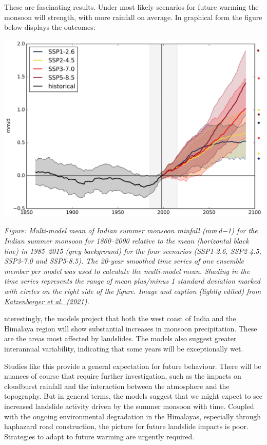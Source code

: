 \documentclass[
]{book}
\begin{document}
These are fascinating results. Under most likely scenarios for future warming the monsoon will strength, with more rainfall on average. In graphical form the figure below displays the outcomes:

\includegraphics{fig/petley_monsoon.png}

\emph{Figure: Multi-model mean of Indian summer monsoon rainfall (mm d−1) for the Indian summer monsoon for 1860--2090 relative to the mean (horizontal black line) in 1985--2015 (grey background) for the four scenarios (SSP1-2.6, SSP2-4.5, SSP3-7.0 and SSP5-8.5). The 20-year smoothed time series of one ensemble member per model was used to calculate the multi-model mean. Shading in the time series represents the range of mean plus/minus 1 standard deviation marked with circles on the right side of the figure. Image and caption (lightly edited) from \href{https://esd.copernicus.org/articles/12/367/2021/}{Katzenberger et al.~(2021)}.}

nterestingly, the models project that both the west coast of India and the Himalaya region will show substantial increases in monsoon precipitation. These are the areas most affected by landslides. The models also suggest greater interannual variability, indicating that some years will be exceptionally wet.

Studies like this provide a general expectation for future behaviour. There will be nuances of course that require further investigation, such as the impacts on cloudburst rainfall and the interaction between the atmosphere and the topography. But in general terms, the models suggest that we might expect to see increased landslide activity driven by the summer monsoon with time. Coupled with the ongoing environmental degradation in the Himalayas, especially through haphazard road construction, the picture for future landslide impacts is poor. Strategies to adapt to future warming are urgently required.
\end{document}
